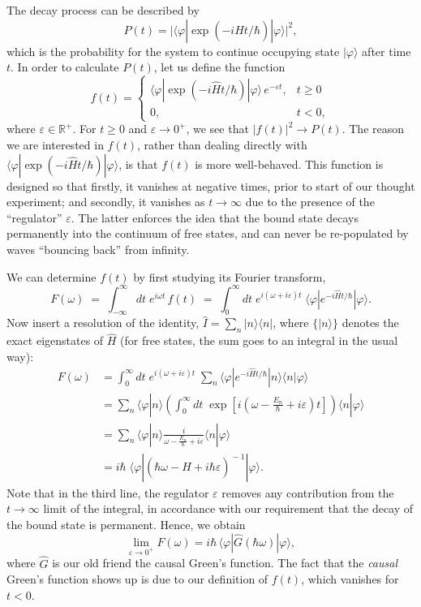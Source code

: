 \documentclass[pra,12pt]{revtex4}
\begin{document}
The decay process can be described by
$$P(t) = \Big|\langle\varphi|\exp\left(-i\hat{H}t/\hbar\right)|\varphi\rangle\Big|^2,$$
which is the probability for the system to continue occupying state
$|\varphi\rangle$ after time $t$.  In order to calculate $P(t)$, let
us define the function
$$f(t) = \begin{cases} \langle\varphi|\exp\left(-i\hat{H}t/\hbar\right)|\varphi\rangle \,e^{-\varepsilon t}, & t \ge 0 \\ 0, & t < 0,\end{cases}$$
where $\varepsilon \in \mathbb{R}^+$.  For $t \ge 0$ and $\varepsilon
\rightarrow 0^+$, we see that $|f(t)|^2 \rightarrow P(t)$.  The reason
we are interested in $f(t)$, rather than dealing directly with
$\langle\varphi|\exp(-i\hat{H}t/\hbar)|\varphi\rangle$, is that $f(t)$
is more well-behaved.  This function is designed so that firstly, it
vanishes at negative times, prior to start of our thought experiment;
and secondly, it vanishes as $t\rightarrow\infty$ due to the presence
of the ``regulator'' $\varepsilon$.  The latter enforces the idea that
the bound state decays permanently into the continuum of free states,
and can never be re-populated by waves ``bouncing back'' from
infinity.

We can determine $f(t)$ by first studying its Fourier transform,
$$F(\omega) \;=\; \int_{-\infty}^\infty dt \; e^{i\omega t}\, f(t) \;=\; \int_0^\infty dt \; e^{i(\omega + i\varepsilon) t} \; \langle\varphi|e^{-i\hat{H}t/\hbar}|\varphi\rangle.$$
Now insert a resolution of the identity, $\hat{I} = \sum_n
|n\rangle\langle n|$, where $\{|n\rangle\}$ denotes the exact
eigenstates of $\hat{H}$ (for free states, the sum goes to an integral
in the usual way):
$$\begin{aligned}F(\omega) &= \int_0^\infty dt \; e^{i(\omega + i\varepsilon) t} \; \sum_n \langle\varphi|e^{-i\hat{H}t/\hbar}|n\rangle\langle n|\varphi\rangle \\ &= \sum_n \langle\varphi|n\rangle \left( \int_0^\infty dt \; \exp\left[i\left(\omega - \frac{E_n}{\hbar} + i\varepsilon\right) t\right] \right) \langle n|\varphi\rangle \\ &= \sum_n \langle\varphi|n\rangle \frac{i}{\omega - \frac{E_n}{\hbar} + i \varepsilon} \langle n|\varphi\rangle \\ &= i \hbar\; \langle \varphi | \left(\hbar\omega - \hat{H} + i\hbar\varepsilon \right)^{\!-1} | \varphi\rangle. \end{aligned}$$
Note that in the third line, the regulator $\varepsilon$ removes any
contribution from the $t \rightarrow\infty$ limit of the integral, in
accordance with our requirement that the decay of the bound state is
permanent.  Hence, we obtain
$$\lim_{\varepsilon \rightarrow 0^+} F(\omega) = i \hbar \, \langle \varphi | \hat{G}(\hbar\omega) | \varphi\rangle,$$
where $\hat{G}$ is our old friend the causal Green's function.  The
fact that the \textit{causal} Green's function shows up is due to our
definition of $f(t)$, which vanishes for $t < 0$.
\end{document}
